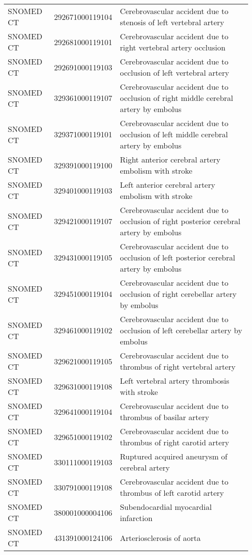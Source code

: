 \begin{longtable}{p{}p{}p{}}
  SNOMED CT & 292671000119104 & Cerebrovascular accident due to stenosis of left vertebral artery \\ 
  SNOMED CT & 292681000119101 & Cerebrovascular accident due to right vertebral artery occlusion \\ 
  SNOMED CT & 292691000119103 & Cerebrovascular accident due to occlusion of left vertebral artery \\ 
  SNOMED CT & 329361000119107 & Cerebrovascular accident due to occlusion of right middle cerebral artery by embolus \\ 
  SNOMED CT & 329371000119101 & Cerebrovascular accident due to occlusion of left middle cerebral artery by embolus \\ 
  SNOMED CT & 329391000119100 & Right anterior cerebral artery embolism with stroke \\ 
  SNOMED CT & 329401000119103 & Left anterior cerebral artery embolism with stroke \\ 
  SNOMED CT & 329421000119107 & Cerebrovascular accident due to occlusion of right posterior cerebral artery by embolus \\ 
  SNOMED CT & 329431000119105 & Cerebrovascular accident due to occlusion of left posterior cerebral artery by embolus \\ 
  SNOMED CT & 329451000119104 & Cerebrovascular accident due to occlusion of right cerebellar artery by embolus \\ 
  SNOMED CT & 329461000119102 & Cerebrovascular accident due to occlusion of left cerebellar artery by embolus \\ 
  SNOMED CT & 329621000119105 & Cerebrovascular accident due to thrombus of right vertebral artery \\ 
  SNOMED CT & 329631000119108 & Left vertebral artery thrombosis with stroke \\ 
  SNOMED CT & 329641000119104 & Cerebrovascular accident due to thrombus of basilar artery \\ 
  SNOMED CT & 329651000119102 & Cerebrovascular accident due to thrombus of right carotid artery \\ 
  SNOMED CT & 330111000119103 & Ruptured acquired aneurysm of cerebral artery \\ 
  SNOMED CT & 330791000119108 & Cerebrovascular accident due to thrombus of left carotid artery \\ 
  SNOMED CT & 380001000004106 & Subendocardial myocardial infarction \\ 
  SNOMED CT & 431391000124106 & Arteriosclerosis of aorta \\ 

\end{longtable}
